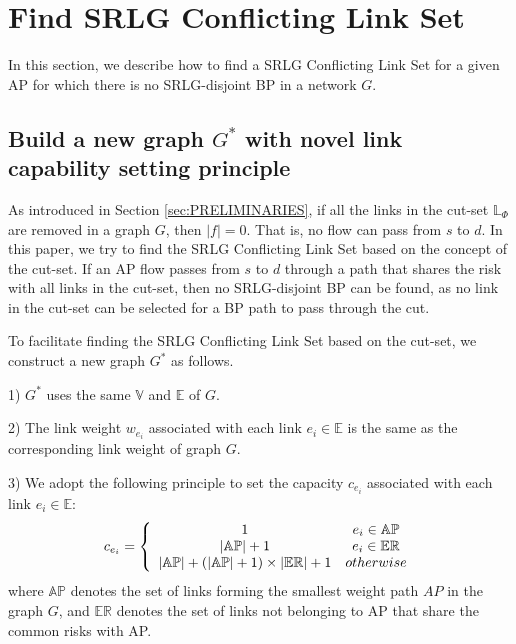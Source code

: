 \section{Find SRLG Conflicting Link Set}
\label{sec:Find SRLG conflict link set}
In this section, we describe how to find a SRLG Conflicting Link Set for a given AP for which there is no SRLG-disjoint BP in a network $G$.

\subsection{Build a new graph $G^*$ with novel link capability setting principle}

As introduced in Section \ref{sec:PRELIMINARIES},  if all the links in the cut-set $\mathbb{\mathbb{L}}_{\Phi}$ are removed in a graph $G$, then $|f| = 0$. That is, no flow can pass from $s$ to $d$. In this paper,  we try to find the SRLG Conflicting Link Set based on the concept of the cut-set. If an AP flow passes from $s$ to $d$ through a path that shares the risk with  all links in the cut-set, then no SRLG-disjoint BP can be found, as no link in the cut-set can be selected for a BP path to pass through the cut.

To facilitate finding the SRLG Conflicting Link Set based on the cut-set, we construct a new graph $G^*$ as follows.

1) $G^*$ uses the same ${\mathbb{V}}$ and ${\mathbb{E}}$ of $G$.

2) The link weight $w_{e_i}$ associated with each link $e_i \in \mathbb{E}$ is the same as the corresponding link weight of graph $G$.

3) We adopt the following principle to set the capacity $c_{e_i}$ associated with each link $e_i \in \mathbb{E}$:
  \begin{equation}
c_{e_i} = \left\{ {\begin{array}{*{20}{c}}
   1 & {e_i{\rm{ }} \in {\rm{ \mathbb{AP}}}}  \\
   {\left| \mathbb{AP} \right|+1} & {e_i{\rm{ }} \in {\rm{ \mathbb{E}}}{{\rm{\mathbb{R}}}}}  \\
   {\left| {{\rm\mathbb{AP}}} \right| + \left( {\left| {{\rm\mathbb{AP}}} \right| + 1} \right)\times \left| {{\rm{\mathbb{E}}}{{\rm{\mathbb{R}}}}} \right| + 1} & {otherwise}  \\
\end{array}} \right.
\label{eq:capacity principle}
\end{equation}
where $\mathbb{AP}$ denotes the set of links forming the smallest weight path $AP$ in the graph $G$,  and $\mathbb{\mathbb{ER}}$ denotes the set of links not belonging to AP that share the common risks with AP.

